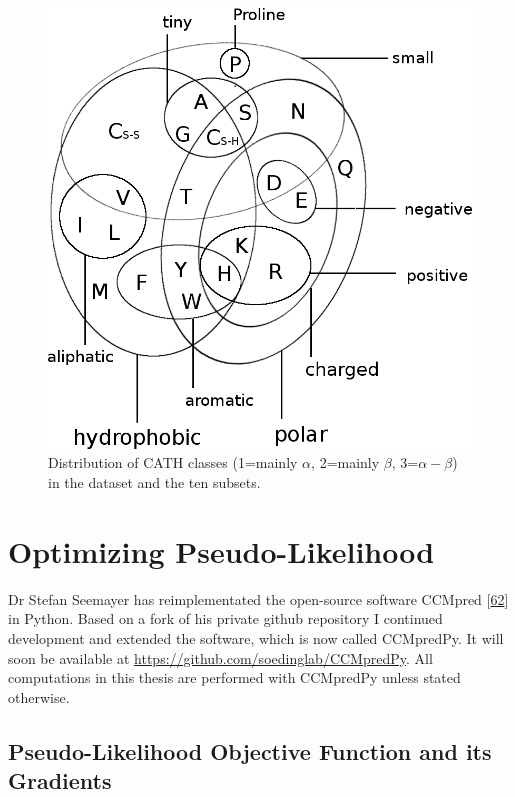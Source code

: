 \documentclass[12pt,a4paper,twoside]{book}
\theoremstyle{definition}
\theoremstyle{definition}
\theoremstyle{remark}
\begin{document}
\begin{figure}
\includegraphics[width=1\linewidth]{img/amino_acid_physico_chemical_properties_venn_diagramm} \caption{Distribution of CATH classes
(1=mainly \(\alpha\), 2=mainly \(\beta\), 3=\(\alpha-\beta\)) in the
dataset and the ten subsets. }\label{fig:dataset-cath-topologies}
\end{figure}

\section{Optimizing
Pseudo-Likelihood}\label{optimizing-pseudo-likelihood}

Dr Stefan Seemayer has reimplementated the open-source software CCMpred
{[}\protect\hyperlink{ref-Seemayer2014}{62}{]} in Python. Based on a
fork of his private github repository I continued development and
extended the software, which is now called CCMpredPy. It will soon be
available at \url{https://github.com/soedinglab/CCMpredPy}. All
computations in this thesis are performed with CCMpredPy unless stated
otherwise.

\subsection{Pseudo-Likelihood Objective Function and its
Gradients}\label{pseudo-likelihood-objective-function-and-its-gradients}
\end{document}
